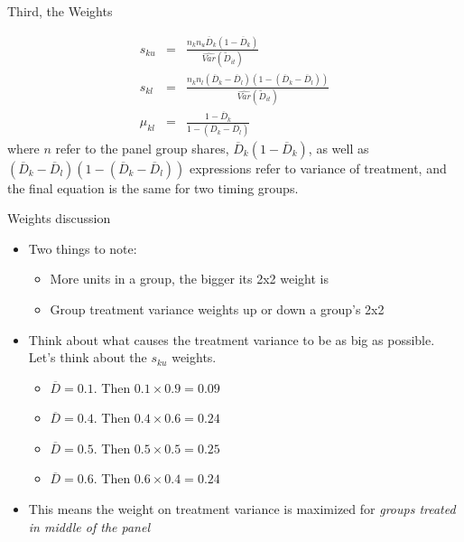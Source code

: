 \documentclass{beamer}
\begin{document}
\begin{frame}{Third, the Weights}

 \begin{eqnarray*} s_{ku} &=& \frac{ n_k n_u \overline{D}_k (1- \overline{D}_k ) }{ \widehat{Var} ( \tilde{D}_{it} )} \\
s_{kl} &=& \frac{ n_k n_l (\overline{D}_k - \overline{D}_{l} ) ( 1- ( \overline{D}_k - \overline{D}_{l} )) }{\widehat{Var}(\tilde{D}_{it})} \\
\mu_{kl} &=& \frac{1 - \overline{D}_k }{1 - ( \overline{D}_k - \overline{D}_{l} )}
\end{eqnarray*}where $n$ refer to the panel group shares, $\overline{D}_k (1- \overline{D}_k )$, as well as $(\overline{D}_k - \overline{D}_{l} ) ( 1- ( \overline{D}_k - \overline{D}_{l} ))$ expressions refer to variance of treatment, and the final equation is the same for two timing groups.

\end{frame}

\begin{frame}{Weights discussion}

\begin{itemize}
\item Two things to note:
	\begin{itemize}
	\item More units in a group, the bigger its 2x2 weight is
	\item Group treatment variance weights up or down a group's 2x2
	\end{itemize}
\item Think about what causes the treatment variance to be as big as possible. Let's think about the $s_{ku}$ weights.
	\begin{itemize}
	\item $\overline{D}=0.1$. Then $0.1 \times 0.9 = 0.09$
	\item $\overline{D}=0.4$. Then $0.4 \times 0.6 =0.24$
	\item $\overline{D}=0.5$. Then $0.5 \times 0.5 = 0.25$
	\item $\overline{D}=0.6$. Then $0.6 \times 0.4 = 0.24$
	\end{itemize}
\item This means the weight on treatment variance is maximized for \emph{groups treated in middle of the panel}
\end{itemize}
\end{frame}
\end{document}
